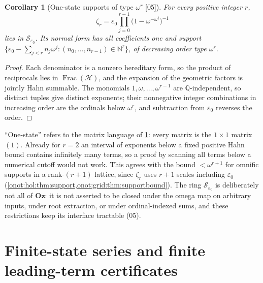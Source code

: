 \documentclass[11pt,oneside]{article}
\numberwithin{equation}{section}
\newtheorem{corollary}[corollary]{Corollary}
\theoremstyle{definition}
\theoremstyle{remark}
\newcommand{\Oz}{\mathbf{Oz}}
\newcommand{\N}{\mathbb N}
\newcommand{\Q}{\mathbb Q}
\newcommand{\FH}{\operatorname{Frac}(\mathcal H)}
\newcommand{\SE}{\mathcal S_{\varepsilon_0}}
\newcommand{\src}[1]{\textup{\textsf{\small[#1]}}}
\begin{document}
\begin{corollary}[One-state supports of type $\omega^r$ \src{05}]\label{onot:sh:cor:omegar}
For every positive integer $r$,
\begin{equation}\label{onot:sh:eq:omegar}
 \zeta_r=\varepsilon_0\prod_{j=0}^{r-1}\bigl(1-\omega^{-\omega^j}\bigr)^{-1}
\end{equation}
lies in $\SE$. Its normal form has all coefficients one and support
$\{\varepsilon_0-\sum_{j<r}n_j\omega^j:(n_0,\ldots,n_{r-1})\in\N^r\}$, of
decreasing order type $\omega^r$.
\end{corollary}
\begin{proof}
Each denominator is a nonzero hereditary form, so the product of reciprocals lies
in $\FH$, and the expansion of the geometric factors is jointly Hahn summable. The
monomials $1,\omega,\ldots,\omega^{r-1}$ are $\Q$-independent, so distinct tuples
give distinct exponents; their nonnegative integer combinations in increasing
order are the ordinals below $\omega^r$, and subtraction from $\varepsilon_0$
reverses the order.
\end{proof}

``One-state'' refers to the matrix language of \cref{onot:sh:sec:matrices}: every
matrix is the $1\times1$ matrix $(1)$. Already for $r=2$ an interval of exponents
below a fixed positive Hahn bound contains infinitely many terms, so a proof by
scanning all terms below a numerical cutoff would not work. This agrees with the
bound $<\omega^{r+1}$ for omnific supports in a rank-$(r+1)$ lattice, since
$\zeta_r$ uses $r+1$ scales including $\varepsilon_0$
(\cref{onot:hol:thm:support,onot:grid:thm:supportbound}). The ring $\SE$ is
deliberately not all of $\Oz$: it is not asserted to be closed under the omega
map on arbitrary inputs, under root extraction, or under ordinal-indexed sums,
and these restrictions keep its interface tractable (05).

\section{Finite-state series and finite leading-term certificates}\label{onot:sh:sec:matrices}
\end{document}
